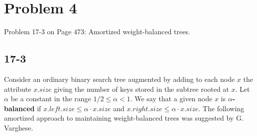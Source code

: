 \documentclass{../../class}
\begin{document}
\newpage
\section*{Problem 4}
\begin{tcolorbox}
    Problem 17-3 on Page 473: Amortized weight-balanced trees.
\end{tcolorbox}
\subsection*{17-3}
Consider an ordinary binary search tree augmented by adding to each node $x$ the attribute $x.size$ giving the number of keys stored in the subtree rooted at $x$. Let $\alpha $ be a constant in the range $1/2 \leq \alpha < 1$. We say that a given node $x$ is $\mathbb{\alpha}$\textbf{-balanced} if $x.left.size \leq \alpha \cdot x.size$ and $x.right.size \leq \alpha \cdot x.size$. The following amortized approach to maintaining weight-balanced trees was suggested by G. Varghese.
\end{document}
